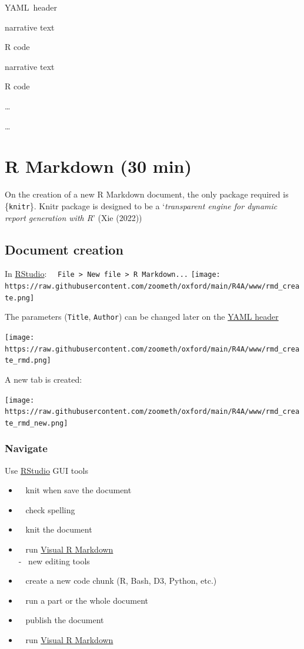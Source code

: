 \documentclass[
]{article}
\begin{document}
YAML{~header}

narrative text

{R code}

narrative text

{R code}

{\ldots{}}

{\ldots{}}

\hypertarget{r-markdown-30-min}{%
\section{R Markdown (30 min)}\label{r-markdown-30-min}}

On the creation of a new R Markdown document, the only package required
is \{\texttt{knitr}\}. Knitr package is designed to be a
`\emph{transparent engine for dynamic report generation with R}' (Xie
(2022))

\hypertarget{document-creation}{%
\subsection{Document creation}\label{document-creation}}

In \href{https://rmarkdown.rstudio.com/}{RStudio}:
 \texttt{File\ \textgreater{}\ New\ file\ \textgreater{}\ R\ Markdown...}
\texttt{[image: https://raw.githubusercontent.com/zoometh/oxford/main/R4A/www/rmd\_create.png]}

The parameters (\texttt{Title}, \texttt{Author}) can be changed later on
the \protect\hyperlink{yaml}{YAML header}

\texttt{[image: https://raw.githubusercontent.com/zoometh/oxford/main/R4A/www/rmd\_create\_rmd.png]}

A new tab is created:

\texttt{[image: https://raw.githubusercontent.com/zoometh/oxford/main/R4A/www/rmd\_create\_rmd\_new.png]}

\hypertarget{navigate}{%
\subsubsection{Navigate}\label{navigate}}

Use \href{https://rmarkdown.rstudio.com/}{RStudio} GUI tools

\begin{itemize}
\item
    knit when save the document
\item
    check spelling
\item
    knit the document
\item
    run \href{https://rstudio.github.io/visual-markdown-editing/}{Visual
  R Markdown}\\
  -  new editing tools
\item
    create a new code chunk (R, Bash, D3, Python, etc.)
\item
    run a part or the whole document
\item
    publish the document
\item
    run \href{https://rstudio.github.io/visual-markdown-editing/}{Visual
  R Markdown}
\end{itemize}
\end{document}
